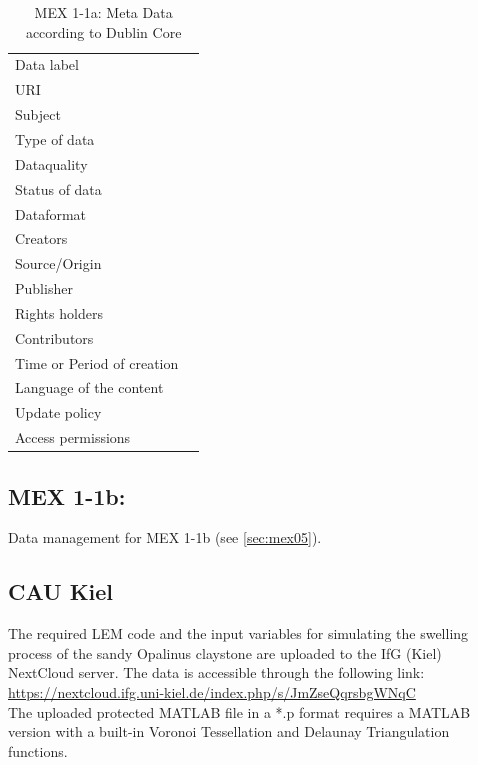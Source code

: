 \begin{table}[h!]
\caption{MEX 1-1a: Meta Data according to Dublin Core}
\label{tab:}
\small
\begin{tabular}{R{3cm}|L{7cm}}
\hline
%
Data label &  \\
URI &  \\
Subject  &  \\
Type of data  &  \\
Dataquality  &  \\
Status of data  &  \\
Dataformat  & \\
Creators  &  \\
Source/Origin &  \\
Publisher  &  \\
Rights holders &  \\
Contributors &  \\
Time or Period of creation &  \\
Language of the content &  \\
Update policy &  \\
Access permissions &  \\
%
\hline
\end{tabular}
\end{table}

\subsection{MEX 1-1b:}

Data management for MEX 1-1b (see \ref{sec:mex05}).

\subsection*{CAU Kiel}
The required LEM code and the input variables for simulating the swelling process of the sandy Opalinus claystone are uploaded to the IfG (Kiel) NextCloud server. The data is accessible through the following link:\\
\hyperlink{https://nextcloud.ifg.uni-kiel.de/index.php/s/JmZseQqrsbgWNqC}{https://nextcloud.ifg.uni-kiel.de/index.php/s/JmZseQqrsbgWNqC}\\

The uploaded protected MATLAB file in a *.p format requires a MATLAB version with a built-in Voronoi Tessellation and Delaunay Triangulation functions.


